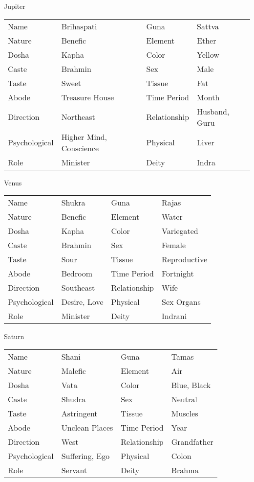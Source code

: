 Jupiter
\begin{center}
\begin{tabular}{ l l l l}
Name	&Brihaspati	&Guna	&Sattva\\
Nature	&Benefic	&Element	&Ether\\
Dosha	&Kapha	&Color	&Yellow\\
Caste	&Brahmin	&Sex	&Male\\
Taste	&Sweet	&Tissue	&Fat\\
Abode	&Treasure House	&Time Period	&Month\\
Direction	&Northeast	&Relationship	&Husband, Guru\\
Psychological	&Higher Mind, Conscience	&Physical	&Liver\\
Role	&Minister	&Deity	&Indra\\
 \end{tabular}
\end{center}

Venus
\begin{center}
\begin{tabular}{ l l l l}
Name	&Shukra	&Guna	&Rajas\\
Nature	&Benefic	&Element	&Water\\
Dosha	&Kapha	&Color	&Variegated\\
Caste	&Brahmin	&Sex	&Female\\
Taste	&Sour	&Tissue	&Reproductive\\
Abode	&Bedroom	&Time Period	&Fortnight\\
Direction	&Southeast	&Relationship	&Wife\\
Psychological	&Desire, Love	&Physical	&Sex Organs\\
Role	&Minister	&Deity	&Indrani\\
 \end{tabular}
\end{center}

Saturn
\begin{center}
\begin{tabular}{ l l l l}
Name	&Shani	&Guna	&Tamas\\
Nature	&Malefic	&Element	&Air\\
Dosha	&Vata	&Color	&Blue, Black\\
Caste	&Shudra	&Sex	&Neutral\\
Taste	&Astringent	&Tissue	&Muscles\\
Abode	&Unclean Places	&Time Period	&Year\\
Direction	&West	&Relationship	&Grandfather\\
Psychological	&Suffering, Ego	&Physical	&Colon\\
Role	&Servant	&Deity	&Brahma\\
 \end{tabular}
\end{center}

